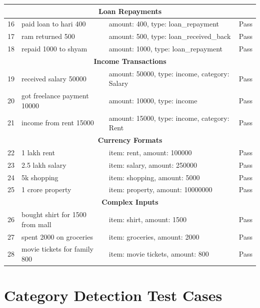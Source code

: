 \begin{longtable}{|p{0.5cm}|p{4cm}|p{4cm}|p{4cm}|}
\multicolumn{4}{c}{\textbf{Loan Repayments}} \\
\hline
16 & paid loan to hari 400 & amount: 400, type: loan\_repayment & Pass \\
\hline
17 & ram returned 500 & amount: 500, type: loan\_received\_back & Pass \\
\hline
18 & repaid 1000 to shyam & amount: 1000, type: loan\_repayment & Pass \\
\hline

\multicolumn{4}{c}{\textbf{Income Transactions}} \\
\hline
19 & received salary 50000 & amount: 50000, type: income, category: Salary & Pass \\
\hline
20 & got freelance payment 10000 & amount: 10000, type: income & Pass \\
\hline
21 & income from rent 15000 & amount: 15000, type: income, category: Rent & Pass \\
\hline

\multicolumn{4}{c}{\textbf{Currency Formats}} \\
\hline
22 & 1 lakh rent & item: rent, amount: 100000 & Pass \\
\hline
23 & 2.5 lakh salary & item: salary, amount: 250000 & Pass \\
\hline
24 & 5k shopping & item: shopping, amount: 5000 & Pass \\
\hline
25 & 1 crore property & item: property, amount: 10000000 & Pass \\
\hline

\multicolumn{4}{c}{\textbf{Complex Inputs}} \\
\hline
26 & bought shirt for 1500 from mall & item: shirt, amount: 1500 & Pass \\
\hline
27 & spent 2000 on groceries & item: groceries, amount: 2000 & Pass \\
\hline
28 & movie tickets for family 800 & item: movie tickets, amount: 800 & Pass \\
\hline

\end{longtable}

\section{Category Detection Test Cases}

